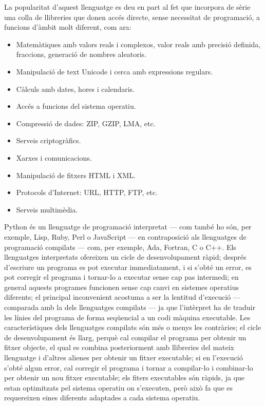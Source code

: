 La popularitat d'aquest llenguatge es deu en part al fet que incorpora de sèrie una colla de llibreries que donen accés directe, sense necessitat de programació, a funcions d'àmbit molt diferent, com ara:
\begin{itemize}
	\item  Matemàtiques amb valors reals i complexos, valor reals amb precisió definida, fraccions, generació de nombres aleatoris.
	\item Manipulació de text Unicode i cerca amb expressions regulars.
	\item Càlculs amb dates, hores i calendaris.
	\item Accés a funcions del sistema operatiu.
	\item Compressió de dades: ZIP, GZIP, LMA, etc.
	\item Serveis criptogràfics.
	\item Xarxes i comunicacions.
	\item Manipulació de fitxers HTML i XML.
	\item Protocols d'Internet: URL, HTTP, FTP, etc.
	\item Serveis multimèdia.
\end{itemize}


Python és un llenguatge de programació interpretat --- com també ho són, per exemple,  Lisp, Ruby, Perl o JavaScript --- en contraposició als llenguatges de programació compilats --- com, per exemple, Ada, Fortran, C o C++. Els llenguatges interpretats ofereixen un cicle de desenvolupament ràpid; després d'escriure un programa es pot executar immediatament, i si s'obté un error, es pot corregir el programa i tornar-lo a executar sense cap pas intermedi; en general aquests programes funcionen sense cap canvi en  sistemes operatius diferents; el principal inconvenient acostuma a ser la lentitud d'execució --- comparada amb la dels llenguatges compilats --- ja que l'intèrpret ha de traduir les línies del programa de forma seqüencial a un codi màquina executable. Les característiques dels llenguatges compilats són més o menys les contràries; el cicle de desenvolupament és llarg, perquè cal compilar el programa per obtenir un fitxer objecte, el qual es combina posteriorment amb llibreries del mateix llenguatge i d'altres alienes per obtenir un fitxer executable; si en l'execució s'obté algun error, cal corregir el programa i tornar a compilar-lo i combinar-lo per obtenir un nou fitxer executable; els fiters executables són ràpids, ja que estan optimitzats pel sistema operatiu on s'executen, però això fa  que  es requereixen eines diferents adaptades a cada sistema operatiu.

